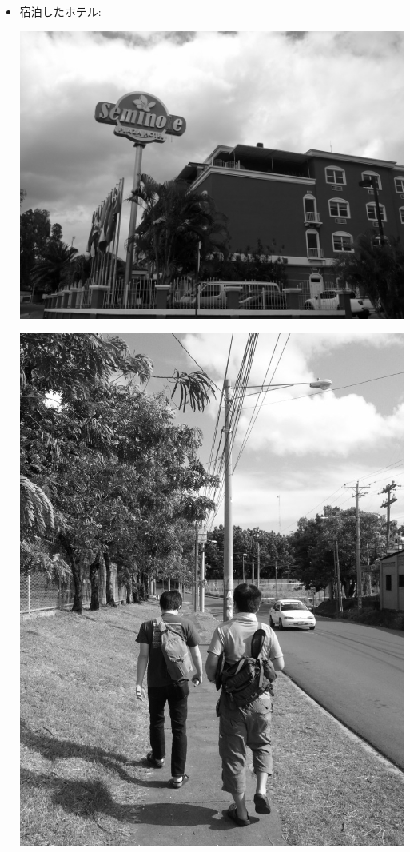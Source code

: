 \documentclass[mingoth,a4paper]{jsarticle}
\begin{document}
\begin{itemize}
 \item 宿泊したホテル:\\
	\begin{minipage}{0.4\hsize}
	\includegraphics[width=0.8\hsize]{image201208/debconf12_hotel_mono.jpg}
	\end{minipage}
        \begin{minipage}{0.4\hsize}
        \includegraphics[width=0.8\hsize]{image201208/debconf12_hotel2_mono.jpg}
        \end{minipage}

\end{itemize} 
\end{document}

